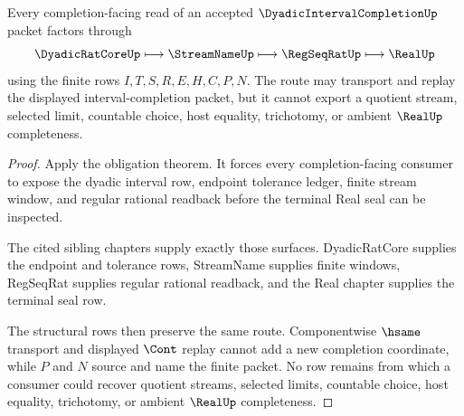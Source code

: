 \begin{theorem}
\label{thm:dyadic-interval-completion-real-seal-route}
Every completion-facing read of an accepted $\DyadicIntervalCompletionUp$ packet factors through
$$
\DyadicRatCoreUp \longmapsto \StreamNameUp \longmapsto \RegSeqRatUp \longmapsto \RealUp
$$
using the finite rows $I,T,S,R,E,H,C,P,N$. The route may transport and replay the displayed interval-completion packet, but it cannot export a quotient stream, selected limit, countable choice, host equality, trichotomy, or ambient $\RealUp$ completeness.
\end{theorem}
\begin{proof}
Apply the obligation theorem. It forces every completion-facing consumer to expose the dyadic interval row, endpoint tolerance ledger, finite stream window, and regular rational readback before the terminal Real seal can be inspected.

The cited sibling chapters supply exactly those surfaces. DyadicRatCore supplies the endpoint and tolerance rows, StreamName supplies finite windows, RegSeqRat supplies regular rational readback, and the Real chapter supplies the terminal seal row.

The structural rows then preserve the same route. Componentwise $\hsame$ transport and displayed $\Cont$ replay cannot add a new completion coordinate, while $P$ and $N$ source and name the finite packet. No row remains from which a consumer could recover quotient streams, selected limits, countable choice, host equality, trichotomy, or ambient $\RealUp$ completeness.
\end{proof}


\begin{closurestatus}{\DyadicIntervalCompletionUp}
  \theoryclosure{\seedClosure}
  \formalstatus{\unformalizedV}
\end{closurestatus}
